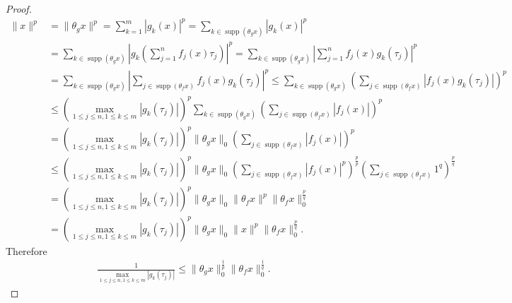 \documentclass[10pt,a4paper]{amsart}
\begin{document}
\begin{proof}
\begin{align*}
\|x\|^p&=\|\theta_gx\|^p=\sum_{k=1}^m|g_k(x)|^p=\sum_{k \in \operatorname{supp}(\theta_gx)}|g_k(x)|^p\\
&=\sum_{k\in \operatorname{supp}(\theta_gx)}\left|g_k\left(\sum_{j=1}^nf_j(x)\tau_j\right)\right|^p
=\sum_{k \in \operatorname{supp}(\theta_gx)}\left|\sum_{j=1}^nf_j(x)g_k(\tau_j)\right|^p\\
&=\sum_{k \in \operatorname{supp}(\theta_gx)}\left|\sum_{j\in \operatorname{supp}(\theta_fx)}f_j(x)g_k(\tau_j)\right|^p\leq \sum_{k \in \operatorname{supp}(\theta_gx)}\left(\sum_{j\in \operatorname{supp}(\theta_fx)}|f_j(x)g_k(\tau_j)|\right)^p\\
&\leq \left(\displaystyle\max_{1\leq j\leq n, 1\leq k\leq m}|g_k(\tau_j)|\right)^p\sum_{k \in \operatorname{supp}(\theta_gx)}\left(\sum_{j\in \operatorname{supp}(\theta_fx)}|f_j(x)|\right)^p\\
&=\left(\displaystyle\max_{1\leq j\leq n, 1\leq k\leq m}|g_k(\tau_j)|\right)^p\|\theta_g x\|_0\left(\sum_{j\in \operatorname{supp}(\theta_fx)}|f_j(x)|\right)^p\\
&\leq \left(\displaystyle\max_{1\leq j\leq n, 1\leq k\leq m}|g_k(\tau_j)|\right)^p\|\theta_g x\|_0\left(\sum_{j\in \operatorname{supp}(\theta_fx)}|f_j(x)|^p\right)^\frac{p}{p}\left(\sum_{j\in \operatorname{supp}(\theta_fx)}1^q\right)^\frac{p}{q}\\
&=\left(\displaystyle\max_{1\leq j\leq n, 1\leq k\leq m}|g_k(\tau_j)|\right)^p\|\theta_g x\|_0\|\theta_f x\|^p\|\theta_f x\|_0^\frac{p}{q}\\
&=\left(\displaystyle\max_{1\leq j\leq n, 1\leq k\leq m}|g_k(\tau_j)|\right)^p\|\theta_g x\|_0\|x\|^p\|\theta_f x\|_0^\frac{p}{q}.
\end{align*}
Therefore 
\begin{align*}
\frac{1}{\displaystyle\max_{1\leq j\leq n, 1\leq k\leq m}|g_k(\tau_j)|}\leq \|\theta_g x\|_0^\frac{1}{p}\|\theta_f x\|_0^\frac{1}{q}.
\end{align*}
\end{proof}
\end{document}
